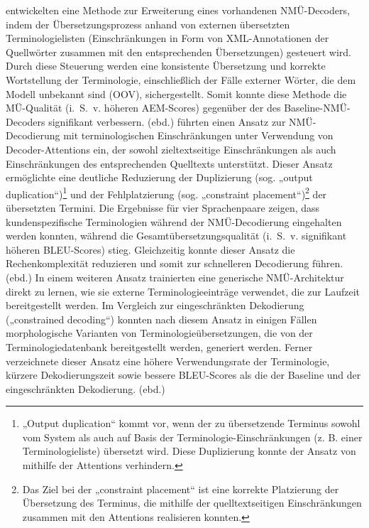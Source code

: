 \citet{ChatterjeeEtAl2017} entwickelten eine Methode zur Erweiterung eines vorhandenen NMÜ-Decoders, indem der Übersetzungsprozess anhand von externen übersetzten Terminologielisten (Einschränkungen in Form von XML-Annotatio\-nen der Quellwörter zusammen mit den entsprechenden Übersetzungen) gesteuert wird. Durch diese Steuerung werden eine konsistente Übersetzung und korrekte Wortstellung der Terminologie, einschließlich der Fälle externer Wörter, die dem Modell unbekannt sind (OOV), sichergestellt. Somit konnte diese Methode die MÜ-Qualität (i.~S.~v. höheren AEM-Scores) gegenüber der des Baseline-NMÜ-Decoders signifikant verbessern. (ebd.) \citet{HaslerEtAl2018} führten einen Ansatz zur NMÜ-Decodierung mit terminologischen Einschränkungen unter Verwendung von Decoder-Attentions ein, der sowohl zieltextseitige Einschränkungen als auch Einschränkungen des entsprechenden Quelltexts unterstützt. Dieser Ansatz ermöglichte eine deutliche Reduzierung der Duplizierung (sog. „output duplication“)\footnote{\textrm{„Output duplication“ kommt vor, wenn der zu übersetzende Terminus sowohl vom System als auch auf Basis der Terminologie-Einschränkungen (z. B. einer Terminologieliste) übersetzt wird. Diese Duplizierung konnte der Ansatz von \citet{HaslerEtAl2018} mithilfe der Attentions verhindern.}} und der Fehlplatzierung (sog. „constraint placement“)\footnote{\textrm{Das Ziel bei der „constraint placement“ ist eine korrekte Platzierung der Übersetzung des Terminus, die \citet{HaslerEtAl2018} mithilfe der quelltextseitigen Einschränkungen zusammen mit den Attentions realisieren konnten.}} der übersetzten Termini. Die Ergebnisse für vier Sprachenpaare zeigen, dass kundenspezifische Terminologien während der NMÜ-Decodierung eingehalten werden konnten, während die Gesamtübersetzungsqualität (i.~S.~v. signifikant höheren BLEU-Scores) stieg. Gleichzeitig konnte dieser Ansatz die Rechenkomplexität reduzieren und somit zur schnelleren Decodierung führen. (ebd.) In einem weiteren Ansatz trainierten \citet{DinuEtAl2019} eine generische NMÜ-Architektur direkt zu lernen, wie sie externe Terminologieeinträge verwendet, die zur Laufzeit bereitgestellt werden. Im Vergleich zur eingeschränkten Dekodierung („constrained decoding“) konnten nach diesem Ansatz in einigen Fällen morphologische Varianten von Terminologieübersetzungen, die von der Terminologiedatenbank bereitgestellt werden, generiert werden. Ferner verzeichnete dieser Ansatz eine höhere Verwendungsrate der Terminologie, kürzere Dekodierungszeit sowie bessere BLEU-Scores als die der Baseline und der eingeschränkten Dekodierung. (ebd.)

